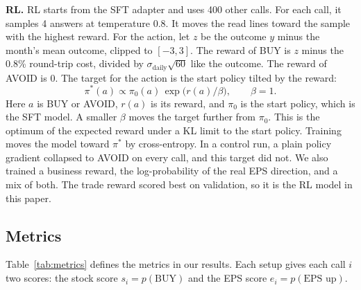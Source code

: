 \documentclass[sigconf,nonacm]{acmart}
\begin{document}
\textbf{RL.} RL starts from the SFT adapter and uses 400 other calls.
For each call, it samples 4 answers at temperature 0.8.
It moves the read lines toward the sample with the highest reward.
For the action, let $z$ be the outcome $y$ minus the month's mean outcome, clipped to $[-3, 3]$.
The reward of BUY is $z$ minus the 0.8\% round-trip cost, divided by $\sigma_{\text{daily}}\sqrt{60}$ like the outcome.
The reward of AVOID is 0.
The target for the action is the start policy tilted by the reward:
\begin{equation}
\pi^{*}(a) \propto \pi_{0}(a)\, \exp\!\big(r(a)/\beta\big), \qquad \beta = 1 .
\end{equation}
Here $a$ is BUY or AVOID, $r(a)$ is its reward, and $\pi_0$ is the start policy, which is the SFT model.
A smaller $\beta$ moves the target further from $\pi_0$.
This is the optimum of the expected reward under a KL limit to the start policy.
Training moves the model toward $\pi^{*}$ by cross-entropy.
In a control run, a plain policy gradient collapsed to AVOID on every call, and this target did not.
We also trained a business reward, the log-probability of the real EPS direction, and a mix of both.
The trade reward scored best on validation, so it is the RL model in this paper.

\subsection{Metrics}\label{sec:eval}

Table~\ref{tab:metrics} defines the metrics in our results.
Each setup gives each call $i$ two scores: the stock score $s_i = p(\text{BUY})$ and the EPS score $e_i = p(\text{EPS up})$.
\end{document}
